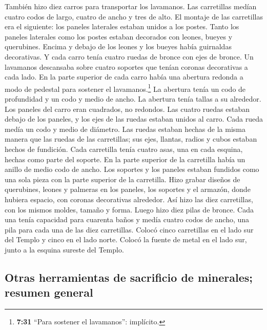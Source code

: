  También hizo diez carros para transportar los lavamanos.
Las carretillas medían cuatro codos de largo, cuatro de ancho y tres de
alto.  El montaje de las carretillas era el siguiente:
los paneles laterales estaban unidos a los postes.  Tanto
los paneles laterales como los postes estaban decorados con leones,
bueyes y querubines. Encima y debajo de los leones y los bueyes había
guirnaldas decorativas.  Y cada carro tenía cuatro ruedas
de bronce con ejes de bronce. Un lavamanos descansaba sobre cuatro
soportes que tenían coronas decorativas a cada lado.  En
la parte superior de cada carro había una abertura redonda a modo de
pedestal para sostener el lavamanos.\footnote{\textbf{7:31} ``Para
  sostener el lavamanos'': implícito.} La abertura tenía un codo de
profundidad y un codo y medio de ancho. La abertura tenía tallas a su
alrededor. Los paneles del carro eran cuadrados, no redondos.
 Las cuatro ruedas estaban debajo de los paneles, y los
ejes de las ruedas estaban unidos al carro. Cada rueda medía un codo y
medio de diámetro.  Las ruedas estaban hechas de la misma
manera que las ruedas de las carretillas; sus ejes, llantas, radios y
cubos estaban hechos de fundición.  Cada carretilla tenía
cuatro asas, una en cada esquina, hechas como parte del soporte.
 En la parte superior de la carretilla había un anillo de
medio codo de ancho. Los soportes y los paneles estaban fundidos como
una sola pieza con la parte superior de la carretilla. 
Hizo grabar diseños de querubines, leones y palmeras en los paneles, los
soportes y el armazón, donde hubiera espacio, con coronas decorativas
alrededor.  Así hizo las diez carretillas, con los mismos
moldes, tamaño y forma.  Luego hizo diez pilas de bronce.
Cada una tenía capacidad para cuarenta baños y medía cuatro codos de
ancho, una pila para cada una de las diez carretillas. 
Colocó cinco carretillas en el lado sur del Templo y cinco en el lado
norte. Colocó la fuente de metal en el lado sur, junto a la esquina
sureste del Templo.

\hypertarget{otras-herramientas-de-sacrificio-de-minerales-resumen-general}{%
\subsection{Otras herramientas de sacrificio de minerales; resumen
general}\label{otras-herramientas-de-sacrificio-de-minerales-resumen-general}}

